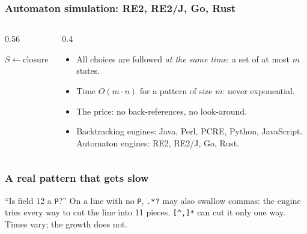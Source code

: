 \documentclass[aspectratio=169,10pt,compress]{beamer}
\begin{document}
\begin{frame}[t,fragile] \frametitle{Automaton simulation: RE2, RE2/J, Go, Rust}
  \begin{columns}[T]
    \begin{column}{0.56\textwidth}


\begin{algorithm}[H]
  \caption{NFA simulation (Thompson)}
  $S \leftarrow \mathrm{closure}(\{q_{0}\})$
\end{algorithm}

    \end{column}
    \begin{column}{0.4\textwidth}
      \begin{itemize}\small
        \item All choices are followed \emph{at the same time}: a set of at most $m$ states.
        \item Time $O(m \cdot n)$ for a pattern of size $m$: never exponential.
        \item The price: no back-references, no look-around.
        \item Backtracking engines: Java, Perl, PCRE, Python, JavaScript. Automaton engines: RE2, RE2/J, Go, Rust.
      \end{itemize}
    \end{column}
  \end{columns}
\end{frame}





\begin{frame}[t,fragile] \frametitle{A real pattern that gets slow}

  \vspace{0.2em}
  \small ``Is field 12 a \texttt{P}?'' On a line with no \texttt{P}, \texttt{.*?} may also swallow commas: the engine tries every way to cut the line into 11 pieces. \texttt{[\textasciicircum ,]*} can cut it only one way. Times vary; the growth does not.
\end{frame}
\end{document}
